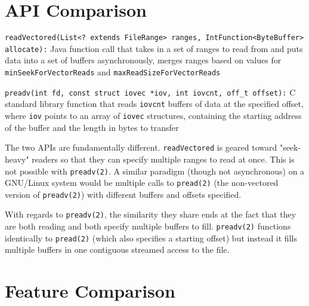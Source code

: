 \documentclass[letterpaper,twocolumn]{article}
\begin{document}
\section{API Comparison}

\begin{description}

\item{}\texttt{readVectored(List<? extends FileRange> ranges, IntFunction<ByteBuffer> allocate):} Java function call that takes in a set of ranges to read from and puts data into a set of buffers asynchronously, merges ranges based on values for \texttt{minSeekForVectorReads} and \texttt{maxReadSizeForVectorReads} \cite{3, 4}

\item{}\texttt{preadv(int fd, const struct iovec *iov, int iovcnt, off\_t offset):} C standard library function that reads \texttt{iovcnt} buffers of data at the specified offset, where \texttt{iov} points to an array of \texttt{iovec} structures, containing the starting address of the buffer and the length in bytes to transfer \cite{6, 7}

\end{description}

The two APIs are fundamentally different. \texttt{readVectored} is geared toward "seek-heavy" readers so that they can specify multiple ranges to read at once. This is not possible with \texttt{preadv(2)}. A similar paradigm (though not asynchronous) on a GNU/Linux system would be multiple calls to \texttt{pread(2)}  (the non-vectored version of \texttt{preadv(2)}) with different buffers and offsets specified.

\noindent With regards to \texttt{preadv(2)}, the similarity they share ends at the fact that they are both reading and both specify multiple buffers to fill. \texttt{preadv(2)} functions identically to \texttt{pread(2)} (which also specifies a starting offset) but instead it fills multiple buffers in one contiguous streamed access to the file.

\section{Feature Comparison}
\end{document}
